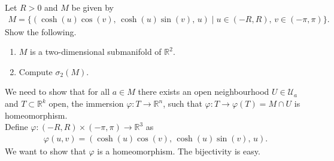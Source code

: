 %
\begin{question}
    Let \(R > 0\) and \(M\) be given by
    \begin{align}
        M = \{(\cosh(u) \cos(v), \, \cosh(u) \sin(v), \, u) \mid u \in (-R, R), \, v \in (-\pi, \pi)\} \text{.}
    \end{align}
    Show the following.
    \begin{enumerate}
        \item \(M\) is a two-dimensional submanifold of \(\mathbb{R}^2\).
        \item Compute \(\sigma_2 (M)\).
    \end{enumerate}
\end{question}
\begin{solution}
    We need to show that for all \(a \in M\) there exists an open neighbourhood \(U \in \mathcal{U}_a\) and \(T \subset \mathbb{R}^k\) open, the immersion \(\varphi: T \rightarrow \mathbb{R}^n\), such that \(\varphi: T \rightarrow \varphi(T) = M \cap U\) is homeomorphism.\\
    Define \(\varphi: (-R, R) \times (-\pi, \pi) \rightarrow \mathbb{R}^3\) as
    \begin{align}
        \varphi(u, v) = (\cosh(u) \cos(v), \, \cosh(u) \sin(v), \, u) \text{.}
    \end{align}
    We want to show that \(\varphi\) is a homeomorphism. The bijectivity is easy.
\end{solution}